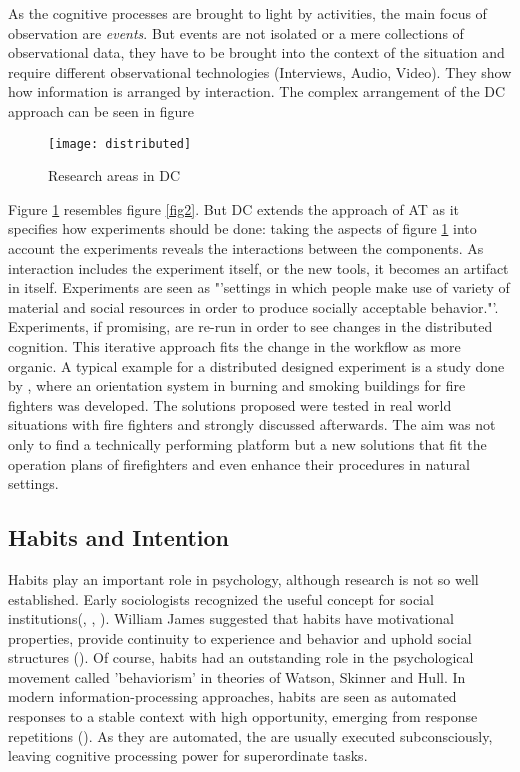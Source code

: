 As the cognitive processes are brought to light by activities, the main focus of observation are \textit{events}. But events are not isolated or a mere collections of observational data, they have to be brought into the context of the situation and require different observational technologies (Interviews, Audio, Video). They show how information is arranged by interaction. The complex arrangement of the \ac{DC} approach can be seen in figure

\begin{figure}[ht]
	\centering
  \texttt{[image: distributed]}
	\caption{Research areas in \ac{DC}}
	\label{fig9}
\end{figure}

Figure \ref{fig9} resembles figure \ref{fig2}. But \ac{DC} extends the approach of \ac{AT} as it specifies how experiments should be done: taking the aspects of figure \ref{fig9} into account the experiments reveals the interactions between the components. As interaction includes the experiment itself, or the new tools, it becomes an artifact in itself. Experiments are seen as "'settings in which people make use of variety of material and social resources in order to produce socially acceptable behavior."'. Experiments, if promising, are re-run in order to see changes in the distributed cognition. This iterative approach fits the change in the workflow as more organic. A typical example for a distributed designed experiment is a study done by \cite{denef2008handy}, where an orientation system in burning and smoking buildings for fire fighters was developed. The solutions proposed were tested in real world situations with fire fighters and strongly discussed afterwards. The aim was not only to find a technically performing platform but a new solutions that fit the operation plans of firefighters and even enhance their procedures in natural settings.

\subsection{Habits and Intention}
\label{habits}
Habits play an important role in psychology, although research is not so well established. Early sociologists recognized the useful concept for social institutions(\cite{weber1946social}, \cite{mead2007movements}, \cite{durkheim1933division}). William James suggested that habits have motivational properties, provide continuity to experience and behavior and uphold social structures (\cite{james2011principles}). Of course, habits had an outstanding role in the psychological movement called 'behaviorism' in theories of Watson, Skinner and Hull\cite{ouellette1998habit}. In modern information-processing approaches, habits are seen as automated responses to a stable context with high opportunity, emerging from response repetitions (\cite{ronis1989attitudes}). As they are automated, the are usually executed subconsciously, leaving cognitive processing power for superordinate tasks. 

